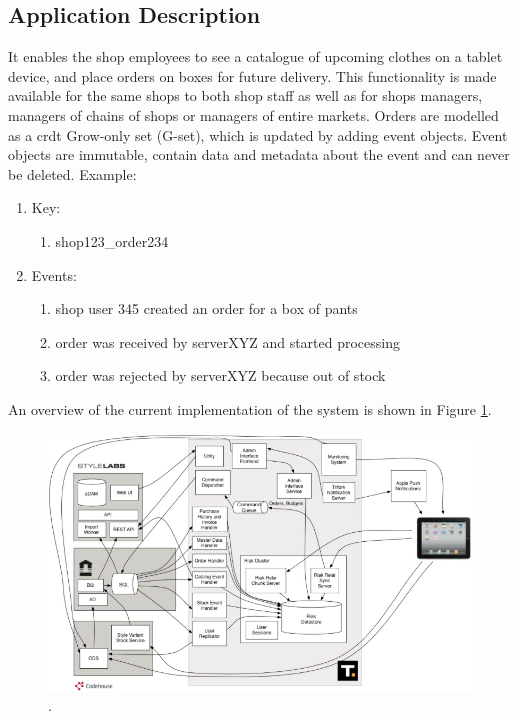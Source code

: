 \documentclass[11pt,a4paper]{report}
\begin{document}
\subsection{Application Description}
It enables the shop employees to see a catalogue of upcoming clothes on a tablet device, and place orders on boxes for future delivery. This functionality is made available for the same shops to both shop staff as well as for shops managers, managers of chains of shops or managers of entire markets.
Orders are modelled as a \gls{crdt} Grow-only set (G-set), which is updated by adding event objects. Event objects are immutable, contain data and metadata about the event and can never be deleted. Example:
\begin{enumerate}
	\item[] Key:
	\begin{enumerate}
		\item[] shop123\_order234
	\end{enumerate}

	\item[] Events:
	\begin{enumerate}
		\item[] shop user 345 created an order for a box of pants

		\item[] order was received by serverXYZ and started processing

		\item[] order was rejected by serverXYZ because out of stock
	\end{enumerate}
\end{enumerate}

An overview of the current implementation of the system is shown in Figure \ref{fig:b2b_implementation}.
\begin{figure}[ht!]
	\centering
	\includegraphics[width=1\textwidth]{./img/b2b.png}

	\caption{.}
	\label{fig:b2b_implementation}
\end{figure}
\end{document}
